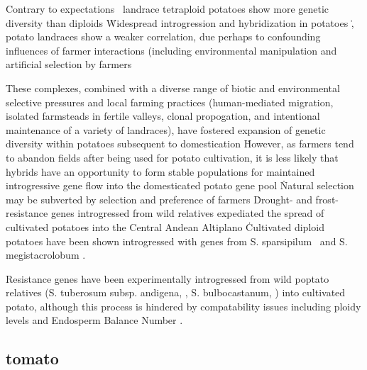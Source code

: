 \documentclass[11pt]{article}
\begin{document}
Contrary to expectations \cite{hamrick1983distribution}\, landrace tetraploid potatoes show more genetic diversity than diploids \cite{zimmerer1991geographical}\.

Widespread introgression and hybridization in potatoes \cite{grun1990evolution}\.

, potato landraces show a weaker correlation, due perhaps to confounding influences of farmer interactions (including environmental manipulation and artificial selection by farmers \cite{zimmerer1991geographical, [[cite other sources from page 45 in this paper}


These complexes, combined with a diverse range of biotic and environmental selective pressures and local farming practices (human-mediated migration, isolated farmsteads in fertile valleys, clonal propogation, and intentional maintenance of a variety of landraces), have fostered expansion of genetic diversity within potatoes subsequent to domestication \cite{brush1995potato}\.
However, as farmers tend to abandon fields after being used for potato cultivation, it is less likely that hybrids have an opportunity to form stable populations for maintained introgressive gene flow into the domesticated potato gene pool \cite{brush1995potato}\.

Natural selection may be subverted by selection and preference of farmers \cite{brush1981dynamics}\.

Drought- and frost-resistance genes introgressed from wild relatives expediated the spread of cultivated potatoes into the Central Andean Altiplano \cite{johns1986ongoing, hawkes1962origin, schmiediche1980breeding}\.

Cultivated diploid potatoes have been shown introgressed with genes from S. sparsipilum \cite{rabinowitz1990high}\ and S. megistacrolobum \cite{johns1987relationships, huaman1980solanum}.

Resistance genes have been experimentally introgressed from wild poptato relatives (S. tuberosum subsp. andigena, \cite{van1999tight}, S. bulbocastanum, \cite{van2003ancient}) into cultivated potato, although this process is hindered by compatability issues including ploidy levels and Endosperm Balance Number \cite{johnston1980significance}.

\subsection*{tomato}
\end{document}
